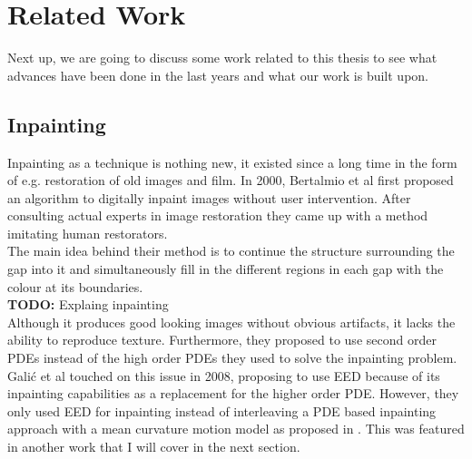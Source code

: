 \section{Related Work}

Next up, we are going to discuss some work related to this thesis to see what advances have been done
in the last years and what our work is built upon.

\subsection{Inpainting}

Inpainting as a technique is nothing new, it existed since a long time in the form of e.g.
restoration of old images and film. In 2000, Bertalmio et al first proposed an algorithm to digitally
inpaint images without user intervention. After consulting actual experts in image restoration they
came up with a method imitating human restorators.\\
The main idea behind their method is to continue the structure
surrounding the gap into it and simultaneously fill in the different regions in each gap with the colour at its
boundaries\cite{bertalmio00}.\\
\textbf{TODO:} Explaing inpainting\\
Although it produces good looking images without obvious artifacts, it lacks the ability to
reproduce texture. Furthermore, they proposed to use second order PDEs instead of the high order
PDEs they used to solve the inpainting problem. Galić et al touched on this issue in 2008,
proposing to use EED because of its inpainting capabilities as a replacement for the higher order
PDE\cite{galic08}.
However, they only used EED for inpainting instead of interleaving a PDE based inpainting approach
with a mean curvature motion model as proposed in \cite{bertalmio00}. This was featured in another
work that I will cover in the next section.

